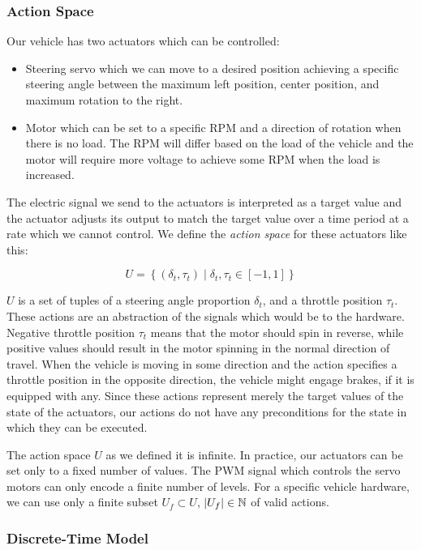 \subsubsection{Action Space}

Our vehicle has two actuators which can be controlled:
\begin{itemize}
	\item Steering servo which we can move to a desired position achieving a specific steering angle between the maximum left position, center position, and maximum rotation to the right.
	
	\item Motor which can be set to a specific \gls{RPM} and a direction of rotation when there is no load. The \gls*{RPM} will differ based on the load of the vehicle and the motor will require more voltage to achieve some RPM when the load is increased.
\end{itemize}

The electric signal we send to the actuators is interpreted as a target value and the actuator adjusts its output to match the target value over a time period at a rate which we cannot control. We define the \textit{action space} for these actuators like this:

\[
	U=\left\{ \left( \delta_t,\tau_t\right) \mid \delta_t,\tau_t\in\left[-1, 1\right] \right\}
\]

$U$ is a set of tuples of a steering angle proportion $\delta_t$, and a throttle position $\tau_t$. These actions are an abstraction of the signals which would be to the hardware. Negative throttle position $\tau_t$ means that the motor should spin in reverse, while positive values should result in the motor spinning in the normal direction of travel. When the vehicle is moving in some direction and the action specifies a throttle position in the opposite direction, the vehicle might engage brakes, if it is equipped with any. Since these actions represent merely the target values of the state of the actuators, our actions do not have any preconditions for the state in which they can be executed.

The action space $U$ as we defined it is infinite. In practice, our actuators can be set only to a fixed number of values. The \gls*{PWM} signal which controls the servo motors can only encode a finite number of levels. For a specific vehicle hardware, we can use only a finite subset $U_f\subset U$, $\left|{U_f}\right|\in\mathbb{N}$ of valid actions.

\subsubsection{Discrete-Time Model}

